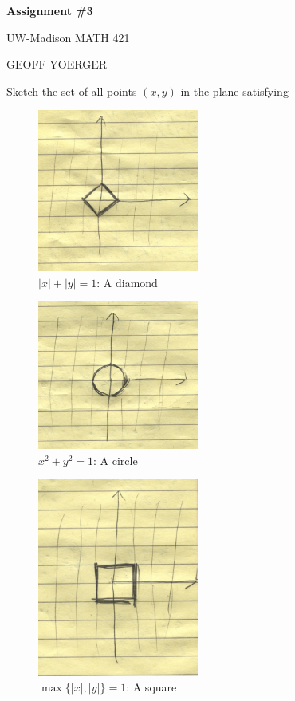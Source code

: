 \documentclass{article} %
\theoremstyle{plain}
\theoremstyle{definition}
\newcommand{\abs}[1]{\left\lvert #1 \right\rvert} %
\begin{document}
\begin{center}
    \Large{
        \textbf{Assignment \#3}

        UW-Madison MATH 421
    }
    
    \vspace{5pt}
        
    \normalsize{
        GEOFF YOERGER

        \usdate
    }
    
    \vspace{15pt}
\end{center}


\noindent{} Sketch the set of all points $(x,y)$ in the plane satisfying 


\begin{figure}[H]
    \includegraphics[width=200px]{diamond.png}
    \caption{$\abs{x}+\abs{y}=1$: A diamond}
\end{figure}
\begin{figure}[H]
    \includegraphics[width=200px]{circle.png}
    \caption{$x^2 + y^2 =1$: A circle}
\end{figure}
\begin{figure}[H]
    \includegraphics[width=200px]{square.png}
    \caption{$\max\{ \abs{x}, \abs{y} \} = 1$: A square}
\end{figure}
\end{document}
